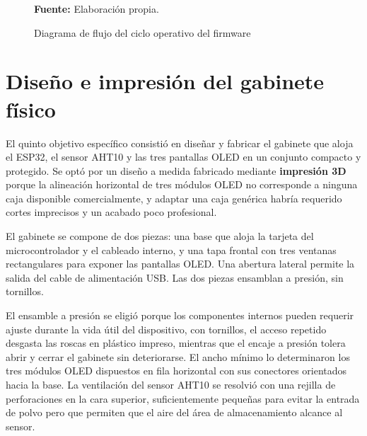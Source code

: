 \begin{figure}[H]
{{%
}%
}
\caption{Diagrama de flujo del ciclo operativo del firmware}
\label{fig:cap3-firmware-loop}
\vspace{0.2cm}
\footnotesize \textbf{Fuente:} Elaboración propia.
\end{figure}



\clearpage
\section{Diseño e impresión del gabinete físico}

El quinto objetivo específico consistió en diseñar y fabricar el gabinete que aloja el ESP32, el sensor AHT10 y las tres pantallas OLED en un conjunto compacto y protegido. Se optó por un diseño a medida fabricado mediante \textbf{impresión 3D} porque la alineación horizontal de tres módulos OLED no corresponde a ninguna caja disponible comercialmente, y adaptar una caja genérica habría requerido cortes imprecisos y un acabado poco profesional.

El gabinete se compone de dos piezas: una base que aloja la tarjeta del microcontrolador y el cableado interno, y una tapa frontal con tres ventanas rectangulares para exponer las pantallas OLED. Una abertura lateral permite la salida del cable de alimentación USB. Las dos piezas ensamblan a presión, sin tornillos.

El ensamble a presión se eligió porque los componentes internos pueden requerir ajuste durante la vida útil del dispositivo, con tornillos, el acceso repetido desgasta las roscas en plástico impreso, mientras que el encaje a presión tolera abrir y cerrar el gabinete sin deteriorarse. El ancho mínimo lo determinaron los tres módulos OLED dispuestos en fila horizontal con sus conectores orientados hacia la base. La ventilación del sensor AHT10 se resolvió con una rejilla de perforaciones en la cara superior, suficientemente pequeñas para evitar la entrada de polvo pero que permiten que el aire del área de almacenamiento alcance al sensor.

